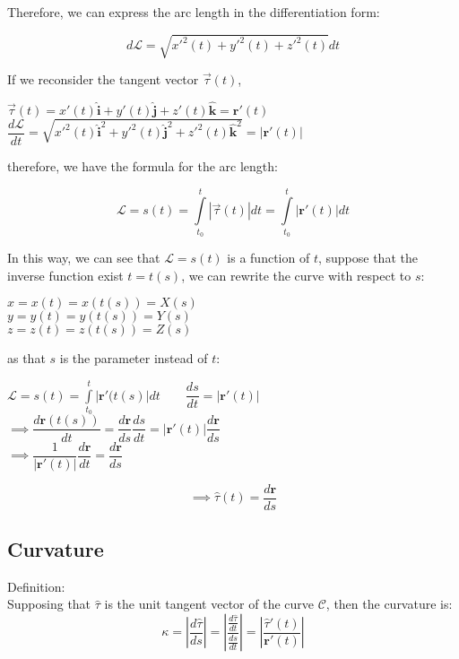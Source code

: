 \documentclass[UTF8,a4paper, 10pt, openany]{svmono}
\begin{document}
Therefore, we can express the arc length in the differentiation form:

\begin{equation}
\boxed{d\mathcal{L}=\sqrt{x'^2(t)+y'^2(t)+z'^2(t)}dt}
\end{equation}

If we reconsider the tangent vector $\overrightarrow{\tau }(t)$,

\begin{center}
$\overrightarrow{\tau }(t)=x'(t)\mathbf{\hat{i}}+y'(t)\mathbf{\hat{j}}+z'(t)\mathbf{\hat{k}}=\mathbf{r}'(t)$\\
$\dfrac{d\mathcal{L}}{dt}=\sqrt{x'^2(t)\mathbf{\hat{i}}^2+y'^2(t)\mathbf{\hat{j}}^2+z'^2(t)\mathbf{\hat{k}}^2}=|\mathbf{r}'(t)|$
\end{center}

therefore, we have the formula for the arc length:

\begin{equation}
\boxed{\mathcal{L}=s(t)=\displaystyle\int\limits_{t_0}^t|\overrightarrow{\tau }(t)|dt=\displaystyle\int\limits_{t_0}^t|\mathbf{r}'(t)|dt}
\end{equation}

In this way, we can see that $\mathcal{L}=s(t)$ is a function of $t$, suppose that the inverse function exist $t=t(s)$, we can rewrite the curve with respect to $s$:
\begin{center}
$x=x(t)=x(t(s))=X(s)$\\
$y=y(t)=y(t(s))=Y(s)$\\
$z=z(t)=z(t(s))=Z(s)$
\end{center}
as that $s$ is the parameter instead of $t$:
\begin{center}
$\mathcal{L}=s(t)=\displaystyle\int\limits_{t_0}^t|\mathbf{r}'(t(s)|dt \qquad \dfrac{ds}{dt}=|\mathbf{r}'(t)|$\\
$\implies \dfrac{d\mathbf{r}(t(s))}{dt}=\dfrac{d\mathbf{r}}{ds}\dfrac{ds}{dt}=|\mathbf{r}'(t)|\dfrac{d\mathbf{r}}{ds}$\\
$\implies \dfrac{1}{|\mathbf{r}'(t)|}\dfrac{d\mathbf{r}}{dt}=\dfrac{d\mathbf{r}}{ds}$\\
\end{center}
\begin{equation}
\boxed{\implies \hat{\tau}(t)=\dfrac{d\mathbf{r}}{ds}}
\end{equation}
\subsection{Curvature}
Definition:\\
Supposing that $\hat{\tau}$ is the unit tangent vector of the curve $\mathcal{C}$, then the curvature is:
\begin{equation}
\boxed{		\kappa=\left| \dfrac{d\hat{\tau}}{ds} \right|	=	\left|\dfrac{\frac{d\hat{\tau}}{dt}}{\frac{ds}{dt}}\right|	=	\left|\dfrac{\hat{\tau}'(t)}{\mathbf{r}'(t)}\right|	}
\end{equation}
\end{document}
